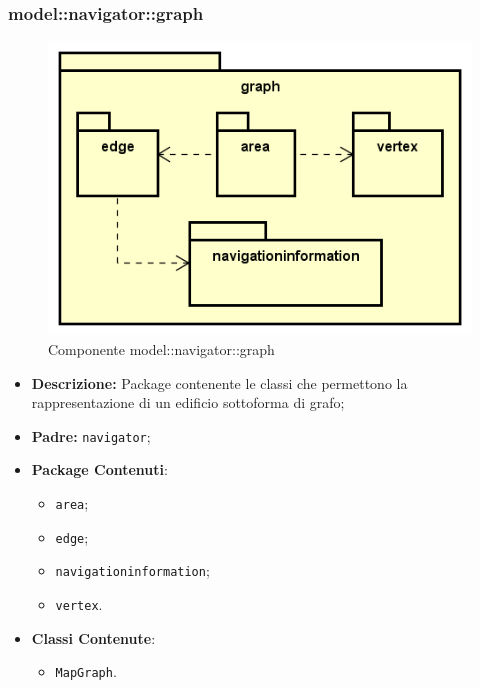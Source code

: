 \documentclass[../DefinizioneDiProdotto.tex]{subfiles}
\begin{document}
\subsubsection{model::\-navigator::\-graph}

\begin{figure}[H]
	\centering
	\includegraphics[width=\maxwidth]{img/package/graph.png}
	\caption{Componente model::\-navigator::\-graph}\label{fig:model::navigator::graph} 
\end{figure}
\begin{itemize}
	\item \textbf{Descrizione:} Package contenente le classi che permettono la rappresentazione di un edificio sottoforma di grafo;
	\item \textbf{Padre:} \texttt{navigator};
	\item \textbf{Package Contenuti}:
	\begin{itemize}
		\item \texttt{area};
		
		\item \texttt{edge};
		
		\item \texttt{navigationinformation};
		
		\item \texttt{vertex}.
		
	\end{itemize}
	\item \textbf{Classi Contenute}:
	\begin{itemize}
		\item \texttt{MapGraph}.
		
	\end{itemize}
\end{itemize}
\end{document}
